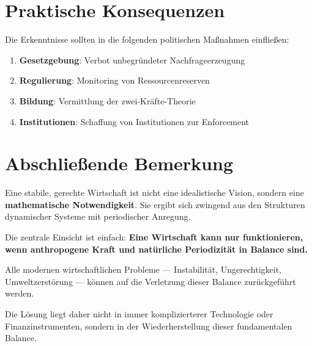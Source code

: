 \documentclass[a4paper,11pt]{report}
\theoremstyle{definition}
\begin{document}
\section{Praktische Konsequenzen}

Die Erkenntnisse sollten in die folgenden politischen Maßnahmen einfließen:

\begin{enumerate}
    \item \textbf{Gesetzgebung}: Verbot unbegründeter Nachfrageerzeugung
    \item \textbf{Regulierung}: Monitoring von Ressourcenreserven
    \item \textbf{Bildung}: Vermittlung der zwei-Kräfte-Theorie
    \item \textbf{Institutionen}: Schaffung von Institutionen zur Enforcement
\end{enumerate}

\section{Abschließende Bemerkung}

Eine stabile, gerechte Wirtschaft ist nicht eine idealistische Vision, sondern eine \textbf{mathematische Notwendigkeit}. Sie ergibt sich zwingend aus den Strukturen dynamischer Systeme mit periodischer Anregung.

Die zentrale Einsicht ist einfach: \textbf{Eine Wirtschaft kann nur funktionieren, wenn anthropogene Kraft und natürliche Periodizität in Balance sind.}

Alle modernen wirtschaftlichen Probleme --- Instabilität, Ungerechtigkeit, Umweltzerstörung --- können auf die Verletzung dieser Balance zurückgeführt werden.

Die Lösung liegt daher nicht in immer komplizierterer Technologie oder Finanzinstrumenten, sondern in der Wiederherstellung dieser fundamentalen Balance.
\end{document}
